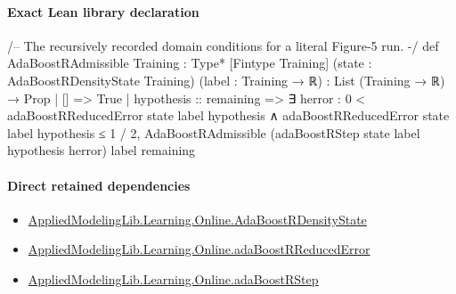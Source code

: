 \documentclass[10pt]{article}
\begin{document}
\paragraph{Exact Lean library declaration}
\begin{ReviewVerbatim}
/-- The recursively recorded domain conditions for a literal Figure-5 run. -/
def AdaBoostRAdmissible
    {Training : Type*} [Fintype Training]
    (state : AdaBoostRDensityState Training) (label : Training → ℝ) :
    List (Training → ℝ) → Prop
  | [] => True
  | hypothesis :: remaining =>
      ∃ herror : 0 < adaBoostRReducedError state label hypothesis ∧
          adaBoostRReducedError state label hypothesis ≤ 1 / 2,
        AdaBoostRAdmissible (adaBoostRStep state label hypothesis herror) label remaining
\end{ReviewVerbatim}

\paragraph{Direct retained dependencies}
\begin{itemize}\raggedright
\item \hyperlink{library-prerequisite-05718297c0c800e4}{Applied\allowbreak{}Modeling\allowbreak{}Lib.\allowbreak{}Learning.\allowbreak{}Online.\allowbreak{}Ada\allowbreak{}Boost\allowbreak{}R\allowbreak{}Density\allowbreak{}State}
\item \hyperlink{governing-declaration-fe36bd27b8697a7b}{Applied\allowbreak{}Modeling\allowbreak{}Lib.\allowbreak{}Learning.\allowbreak{}Online.\allowbreak{}ada\allowbreak{}Boost\allowbreak{}R\allowbreak{}Reduced\allowbreak{}Error}
\item \hyperlink{governing-declaration-07709be11ef699d2}{Applied\allowbreak{}Modeling\allowbreak{}Lib.\allowbreak{}Learning.\allowbreak{}Online.\allowbreak{}ada\allowbreak{}Boost\allowbreak{}R\allowbreak{}Step}
\end{itemize}
\end{document}
